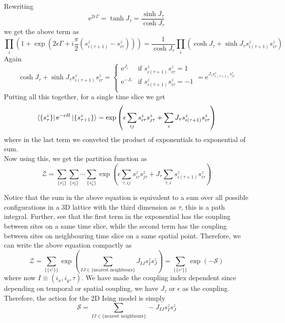 \documentclass[11pt]{article}
\newcommand{\e}{\mathrm{e}}
\numberwithin{equation}{section}
\begin{document}
Rewriting 
\begin{equation*}
    \e^{2\epsilon \Gamma} = \tanh J_\tau = \frac{\sinh J_\tau}{\cosh J_\tau}
\end{equation*}
we get the above term as 
\begin{equation*}
    \prod_i \left(1 +  \exp\left(2\epsilon \Gamma + i\frac{\pi}{2}(s_{i(\tau+1)}^z-s_{i\tau}^z)\right) \right)
    = \frac{1}{\cosh J_\tau}\prod_i \left(\cosh J_\tau +  \sinh J_\tau s_{i(\tau+1)}^z s_{i\tau}^z \right)  
\end{equation*}
Again 
\begin{equation*}
    \cosh J_\tau +  \sinh J_\tau s_{i(\tau+1)}^z s_{i\tau}^z = \begin{cases}
        \e^{J_\tau} & \text{if } s_{i(\tau+1)}^z s_{i\tau}^z = 1 \\
        \e^{-J_\tau} & \text{if } s_{i(\tau+1)}^z s_{i\tau}^z = -1 \\
    \end{cases} = \e^{J_\tau s_{i(\tau+1)}^z s_{i\tau}^z}
\end{equation*}
Putting all this together, for a single time slice we get
\begin{equation*}
    \bra{\{s_\tau^z\}} \e^{-\epsilon H} \ket{\{s_{\tau+1}^z\}} = \exp\left(\epsilon \sum_{ij} s^z_{i\tau}s^z_{j\tau}+\sum_i J_\tau s_{i(\tau+1)}^z s_{i\tau}^z \right) 
\end{equation*}
where in the last term we conveted the product of exponentials to exponential of sum.\\

Now using this, we get the partition function as 
\begin{equation*}
    \mathcal{Z} = \sum_{\{s_1^z\}}\sum_{\{s_2^z\}}\cdots\sum_{\{s_{n}^z\}} \exp\left(\epsilon \sum_{\tau,ij} s^z_{i\tau}s^z_{j\tau}+J_\tau\sum_{\tau,i}  s_{i(\tau+1)}^z s_{i\tau}^z \right) 
\end{equation*}

Notice that the sum in the above equation is equivalent to a sum over all possible configurations in a 3D lattice with the third dimension as \(\tau\), this is a path integral. Further, see that the first term in the exponential has the coupling between sites on a same time slice, while the second term has the coupling between sites on neighbouring time slice on a same spatial point. Therefore, we can write the above equation compactly as 
\begin{equation*}
    \mathcal{Z} = \sum_{\{\{s^z\}\}} \exp\left(  \sum_{IJ\in \{\text{nearest neighbours}\}} J_{IJ} s_I^z s_J^z \right) =  \sum_{\{\{s^z\}\}} \exp\left(  -\mathcal{S}  \right)
\end{equation*}
where now \(I \equiv (i_x, i_y, \tau)\). We have made the coupling index dependent since depending on temporal or spatial coupling, we have \(J_\tau\) or \(\epsilon\) as the coupling. Therefore, the action for the 2D Ising model is simply 
\begin{equation*}
    \mathcal{S} =  \sum_{IJ\in \{\text{nearest neighbours}\}} -J_{IJ} s_I^z s_J^z
\end{equation*} 
\end{document}
